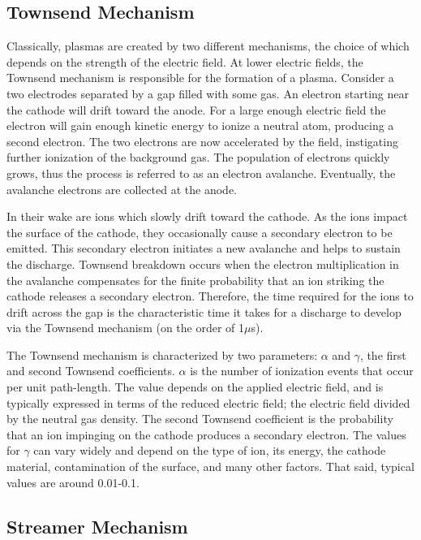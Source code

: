 {\subsection{Townsend Mechanism}

Classically, plasmas are created by two different mechanisms, the choice of
which depends on the strength of the electric field. At lower electric fields,
the Townsend mechanism is responsible for the formation of a plasma. Consider a
two electrodes separated by a gap filled with some gas. An electron starting
near the cathode will drift toward the anode. For a large enough electric field
the electron will gain enough kinetic energy to ionize a neutral atom, producing
a second electron. The two electrons are now accelerated by the field,
instigating further ionization of the background gas. The population of
electrons quickly grows, thus the process is referred to as an electron
avalanche. Eventually, the avalanche electrons are collected at the anode.

In their wake are ions which slowly drift toward the cathode. As the ions impact
the surface of the cathode, they occasionally cause a secondary electron to be
emitted. This secondary electron initiates a new avalanche and helps to sustain
the discharge. Townsend breakdown occurs when the electron multiplication in the
avalanche compensates for the finite probability that an ion striking the
cathode releases a secondary electron. Therefore, the time required for the ions
to drift across the gap is the characteristic time it takes for a discharge to
develop via the Townsend mechanism (on the order of 1$\mu$s).

The Townsend mechanism is characterized by two parameters: $\alpha$ and
$\gamma$, the first and second Townsend coefficients. $\alpha$ is the number of
ionization events that occur per unit path-length. The value depends on the
applied electric field, and is typically expressed in terms of the reduced
electric field; the electric field divided by the neutral gas density. The
second Townsend coefficient is the probability that an ion impinging on the
cathode produces a secondary electron. The values for $\gamma$ can vary widely
and depend on the type of ion, its energy, the cathode material, contamination
of the surface, and many other factors. That said, typical values are around
0.01-0.1.

\subsection{Streamer Mechanism}

}

